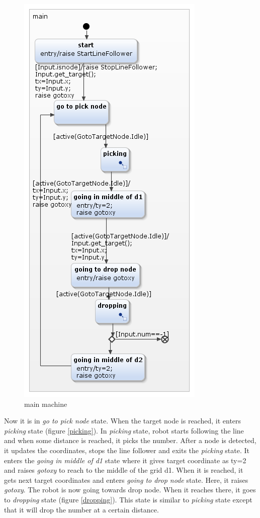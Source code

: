 \documentclass[a4paper,12pt,oneside]{book}
\begin{document}
\begin{itemize}
\begin{figure}[]
	\includegraphics[scale=.8]{main.png}
	\caption{main machine}
	\label{main}
	\end{figure} 
Now it is in \textit{go to pick node} state. When the target node is reached, it enters \textit{picking} state (figure \ref{picking}). In \textit{picking} state, robot starts following the line and when some distance is reached, it picks the number. After a node is detected, it updates the coordinates, stops the line follower and exits the \textit{picking} state. It enters the \textit{going in middle of d1} state where it gives target coordinate as ty=2 and raises \textit{gotoxy} to reach to the middle of the grid d1. When it is reached, it gets next target coordinates and enters \textit{going to drop node} state. Here, it raises \textit{gotoxy}. The robot is now going towards drop node. When it reaches there, it goes to \textit{dropping} state (figure \ref{dropping}). This state is similar to \textit{picking} state except that it will drop the number at a certain distance. 

\end{itemize}
\end{document}
